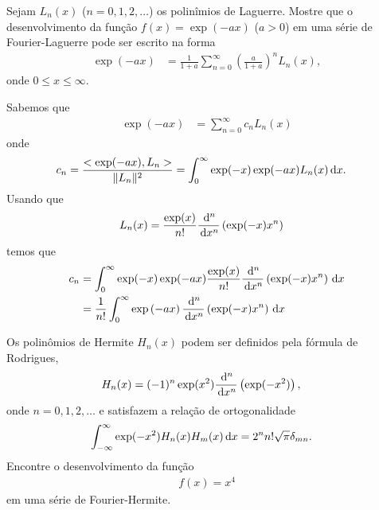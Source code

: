 \documentclass[a4paper,12pt, leqno, answers]{exam}
\begin{document}
\begin{questions}
    \question[T2 de 2011, P1 de 2011] Sejam $L_n(x)$ ($n = 0, 1, 2, \ldots$) os polinîmios de Laguerre. Mostre que o desenvolvimento da função $f(x) = \exp(-ax)$ ($a > 0$) em uma série de Fourier-Laguerre pode ser escrito na forma
    \begin{align*}
        \exp\left( -ax \right) &= \frac{1}{1 + a} \sum_{n = 0}^\infty \left( \frac{a}{1 + a} \right)^n L_n(x),
    \end{align*}
    onde $0 \leq x \leq \infty$.
    \begin{solution}
        Sabemos que
        \begin{align*}
            \exp\left( -ax \right) &= \sum_{n = 0}^\infty c_n L_n(x)
        \end{align*}
        onde
        \begin{align*}
            c_n &= \frac{<\exp(-ax), L_n>}{\| L_n \|^2} = \int_0^\infty \exp(-x) \exp(-ax) L_n(x) \, \mathrm{d}x.
        \end{align*}
        Usando que
        \begin{align*}
            L_n(x) &= \frac{\exp(x)}{n!} \frac{\, \mathrm{d}^n}{\, \mathrm{d}x^n}\left( \exp(-x) x^n \right)
        \end{align*}
        temos que
        \begin{align*}
            c_n &= \int_0^\infty \exp(-x) \exp(-ax) \frac{\exp(x)}{n!} \frac{\, \mathrm{d}^n}{\, \mathrm{d}x^n}\left( \exp(-x) x^n \right) \, \mathrm{d}x \\
            &= \frac{1}{n!} \int_0^\infty \exp\left( -ax \right) \frac{\, \mathrm{d}^n}{\, \mathrm{d}x^n}\left( \exp(-x) x^n \right) \, \mathrm{d}x
        \end{align*}
    \end{solution}

    \question[P1 de 2011] Os polin\^{o}mios de Hermite $H_n(x)$ podem ser definidos pela f\'{o}rmula de Rodrigues,
    \begin{align*}
        H_n(x) &= (-1)^n \exp(x^2) \frac{\, \mathrm{d}^n}{\, \mathrm{d}x^n}\left( \exp(-x^2) \right),
    \end{align*}
    onde $n = 0, 1, 2, \ldots$ e satisfazem a relação de ortogonalidade
    \begin{align*}
        \int_{-\infty}^\infty \exp(-x^2) H_n(x) H_m(x) \, \mathrm{d}x &= 2^n n! \sqrt{\pi} \delta_{mn}.
    \end{align*}
    Encontre o desenvolvimento da função
    \begin{align*}
        f(x) = x^4
    \end{align*}
    em uma série de Fourier-Hermite.
    \begin{solution}
    \end{solution}
\end{questions}
% 
% 
\end{document}
